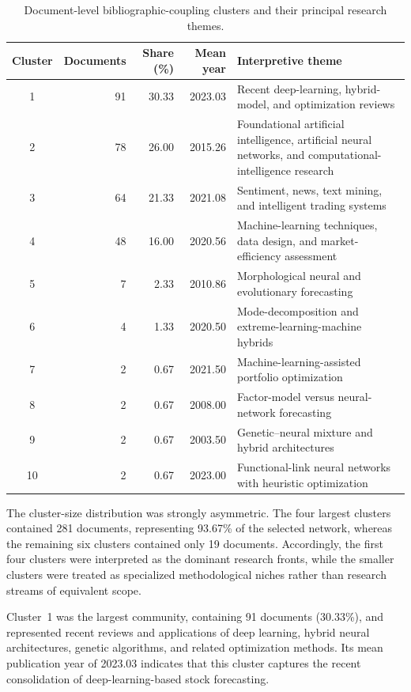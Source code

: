 \documentclass[pdflatex,sn-mathphys-num]{sn-jnl}%
\theoremstyle{thmstyleone}%
\theoremstyle{thmstyletwo}%
\theoremstyle{thmstylethree}%
\begin{document}
\begin{table}[!htbp]
\centering
\caption{Document-level bibliographic-coupling clusters and their
principal research themes.}
\label{tab:bibliographic_coupling_clusters}
\begin{tabular}{c r r r p{6.0cm}}
\hline
\textbf{Cluster} &
\textbf{Documents} &
\textbf{Share (\%)} &
\textbf{Mean year} &
\textbf{Interpretive theme} \\
\hline
1 & 91 & 30.33 & 2023.03 &
Recent deep-learning, hybrid-model, and optimization reviews \\
2 & 78 & 26.00 & 2015.26 &
Foundational artificial intelligence, artificial neural networks,
and computational-intelligence research \\
3 & 64 & 21.33 & 2021.08 &
Sentiment, news, text mining, and intelligent trading systems \\
4 & 48 & 16.00 & 2020.56 &
Machine-learning techniques, data design, and market-efficiency
assessment \\
5 & 7 & 2.33 & 2010.86 &
Morphological neural and evolutionary forecasting \\
6 & 4 & 1.33 & 2020.50 &
Mode-decomposition and extreme-learning-machine hybrids \\
7 & 2 & 0.67 & 2021.50 &
Machine-learning-assisted portfolio optimization \\
8 & 2 & 0.67 & 2008.00 &
Factor-model versus neural-network forecasting \\
9 & 2 & 0.67 & 2003.50 &
Genetic--neural mixture and hybrid architectures \\
10 & 2 & 0.67 & 2023.00 &
Functional-link neural networks with heuristic optimization \\
\hline
\end{tabular}
\end{table}
\FloatBarrier

The cluster-size distribution was strongly asymmetric. The four largest
clusters contained 281 documents, representing 93.67\% of the selected
network, whereas the remaining six clusters contained only 19 documents.
Accordingly, the first four clusters were interpreted as the dominant
research fronts, while the smaller clusters were treated as specialized
methodological niches rather than research streams of equivalent scope.

Cluster~1 was the largest community, containing 91 documents
(30.33\%), and represented recent reviews and applications of deep
learning, hybrid neural architectures, genetic algorithms, and related
optimization methods. Its mean publication year of 2023.03 indicates that
this cluster captures the recent consolidation of deep-learning-based stock
forecasting.
\end{document}
